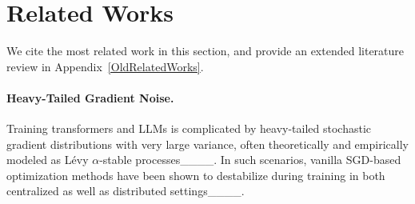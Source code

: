 \section{Related Works}
We cite the most related work in this section, and provide an extended literature review in Appendix~\ref{OldRelatedWorks}. 

\vspace{-1mm}
\paragraph{Heavy-Tailed Gradient Noise.} 
Training transformers and LLMs is complicated by heavy-tailed stochastic gradient distributions with very large variance, often theoretically and empirically modeled as L\'{e}vy $\alpha$-stable processes____. In such scenarios, vanilla SGD-based %
optimization methods have been shown to destabilize during training in both centralized as well as distributed settings____. %

